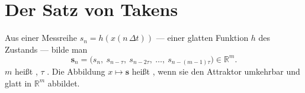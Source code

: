 \section{Der Satz von Takens}

\begin{definition}
Aus einer Messreihe $s_n = h(x(n\,\Delta t))$ --- einer glatten Funktion $h$ des Zustands --- bilde man
\[ \mathbf s_n = \bigl(s_n,\ s_{n-\tau},\ s_{n-2\tau},\ \ldots,\ s_{n-(m-1)\tau}\bigr) \in \mathbb R^{m} . \]
$m$ heißt , $\tau$ . Die Abbildung $x \mapsto \mathbf s$ heißt , wenn sie den Attraktor umkehrbar und glatt in $\mathbb R^{m}$ abbildet.
\end{definition}

